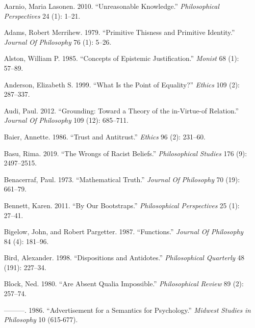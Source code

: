 \documentclass[
  10pt,
  letterpaper,
  DIV=11,
  numbers=noendperiod,
  twoside]{scrartcl}
\newlength{\cslhangindent}
\newenvironment{CSLReferences}[2] %
 {\begin{list}{}{%
  \setlength{\itemindent}{0pt}
  \setlength{\leftmargin}{0pt}
  \setlength{\parsep}{0pt}
  \ifodd #1
   \setlength{\leftmargin}{\cslhangindent}
   \setlength{\itemindent}{-1\cslhangindent}
  \fi
  \setlength{\itemsep}{#2\baselineskip}}}
 {\end{list}}
\begin{document}
\label{refs}
\begin{CSLReferences}{1}{0}
Aarnio, Maria Lasonen. 2010. {``Unreasonable Knowledge.''}
\emph{Philosophical Perspectives} 24 (1): 1--21.

Adams, Robert Merrihew. 1979. {``Primitive Thisness and Primitive
Identity.''} \emph{Journal Of Philosophy} 76 (1): 5--26.

Alston, William P. 1985. {``Concepts of Epistemic Justification.''}
\emph{Monist} 68 (1): 57--89.

Anderson, Elizabeth S. 1999. {``What Is the Point of Equality?''}
\emph{Ethics} 109 (2): 287--337.

Audi, Paul. 2012. {``Grounding: Toward a Theory of the in-Virtue-of
Relation.''} \emph{Journal Of Philosophy} 109 (12): 685--711.

Baier, Annette. 1986. {``Trust and Antitrust.''} \emph{Ethics} 96 (2):
231--60.

Basu, Rima. 2019. {``The Wrongs of Racist Beliefs.''}
\emph{Philosophical Studies} 176 (9): 2497--2515.

Benacerraf, Paul. 1973. {``Mathematical Truth.''} \emph{Journal Of
Philosophy} 70 (19): 661--79.

Bennett, Karen. 2011. {``By Our Bootstraps.''} \emph{Philosophical
Perspectives} 25 (1): 27--41.

Bigelow, John, and Robert Pargetter. 1987. {``Functions.''}
\emph{Journal Of Philosophy} 84 (4): 181--96.

Bird, Alexander. 1998. {``Dispositions and Antidotes.''}
\emph{Philosophical Quarterly} 48 (191): 227--34.

Block, Ned. 1980. {``Are Absent Qualia Impossible.''}
\emph{Philosophical Review} 89 (2): 257--74.

---------. 1986. {``Advertisement for a Semantics for Psychology.''}
\emph{Midwest Studies in Philosophy} 10 (615-677).


\end{CSLReferences}
\end{document}
